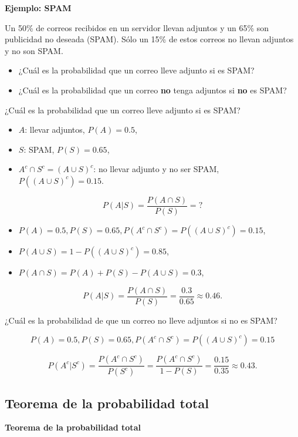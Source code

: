 \documentclass[
  letterpaper,
  DIV=11,
  numbers=noendperiod]{scrreprt}
\providecommand{\tightlist}{%
  \setlength{\itemsep}{0pt}\setlength{\parskip}{0pt}}\usepackage{longtable,booktabs,array}
\begin{document}
\textbf{Ejemplo: SPAM}

Un 50\% de correos recibidos en un servidor llevan adjuntos y un 65\%
son publicidad no deseada (SPAM). Sólo un 15\% de estos correos no
llevan adjuntos y no son SPAM.

\begin{itemize}
\tightlist
\item
  ¿Cuál es la probabilidad que un correo lleve adjunto si es SPAM?
\item
  ¿Cuál es la probabilidad que un correo \textbf{no} tenga adjuntos si
  \textbf{no} es SPAM?
\end{itemize}

¿Cuál es la probabilidad que un correo lleve adjunto si es SPAM?

\begin{itemize}
\tightlist
\item
  \(A\): llevar adjuntos, \(P(A)=0.5\),
\item
  \(S\): SPAM, \(P(S)=0.65\),
\item
  \(A^c\cap S^c=(A\cup S)^c\): no llevar adjunto y no ser SPAM,
  \(P((A\cup S)^c)=0.15\).
\end{itemize}

\[P(A|S)=\dfrac{P(A\cap S)}{P(S)}=?\]

\begin{itemize}
\item
  \(P(A)=0.5, P(S)=0.65, P(A^c\cap S^c)=P((A\cup S)^c)=0.15\),
\item
  \(P(A\cup S)=1-P((A\cup S)^c)=0.85\),
\item
  \(P(A\cap S)=P(A)+P(S)-P(A\cup S)=0.3\),
\end{itemize}

\[P(A|S)=\dfrac{P(A\cap S)}{P(S)}=\dfrac{0.3}{0.65}\approx 0.46.\]

¿Cuál es la probabilidad de que un correo no lleve adjuntos si no es
SPAM?

\[P(A)=0.5, P(S)=0.65, P(A^c\cap S^c)=P((A\cup S)^c)=0.15\]

\[P(A^c|S^c)=\dfrac{P(A^c\cap S^c)}{P(S^c)}=\dfrac{P(A^c\cap S^c)}{1-P(S)}=\dfrac{0.15}{0.35}\approx 0.43.\]

\hypertarget{teorema-de-la-probabilidad-total}{%
\subsection{Teorema de la probabilidad
total}\label{teorema-de-la-probabilidad-total}}

\textbf{Teorema de la probabilidad total}
\end{document}
